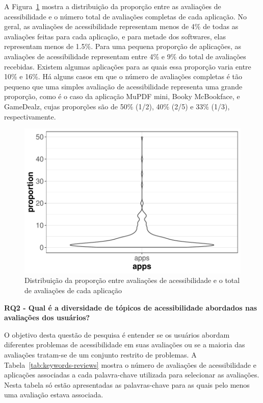 A Figura~\ref{fig:distribution-proportion} mostra a distribuição da proporção entre as avaliações de acessibilidade e o número total de avaliações completas de cada aplicação.
No geral, as avaliações de acessibilidade representam menos de 4\% de todas as avaliações feitas para cada aplicação, e para metade dos softwares, elas representam menos de 1.5\%.
Para uma pequena proporção de aplicações, as avaliações de acessibilidade representam entre 4\% e 9\% do total de avaliações recebidas. Existem algumas aplicações para as quais essa proporção varia entre 10\% e 16\%.
Há alguns casos em que o número de avaliações completas é tão pequeno que uma simples avaliação de acessibilidade representa uma grande proporção, como é o caso da aplicação MuPDF mini, Booky McBookface, e GameDealz, cujas proporções são de 50\% (1/2), 40\% (2/5) e 33\% (1/3), respectivamente. 
\newline 

 \begin{figure}[!htb]
 \centering
\includegraphics[scale=0.8]{imagens/distribution-proportion-accreviews}
\caption{Distribuição da proporção entre avaliações de acessibilidade e o total de avaliações de cada aplicação}
\label{fig:distribution-proportion}
\end{figure}


\textbf{RQ2 - Qual é a diversidade de tópicos de acessibilidade abordados nas avaliações dos usuários?}

O objetivo desta questão de pesquisa é entender se os usuários abordam diferentes problemas de acessibilidade em suas avaliações ou se a maioria das avaliações tratam-se de um conjunto restrito de problemas. 
A Tabela~\ref{tab:keywords-reviews} mostra o número de avaliações de acessibilidade e aplicações associadas a cada palavra-chave utilizada para selecionar as avaliações. 
Nesta tabela só estão apresentadas as palavras-chave para as quais pelo menos uma avaliação estava associada. 

